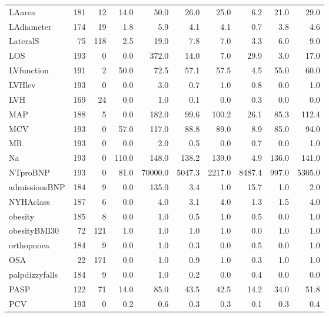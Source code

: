 \begin{footnotesize}
\begin{tabularx}{\textwidth}{P{2.4cm}RRRRRRRRR}
LAarea & 181 &  12 &  14.0 &    50.0 &   26.0 &   25.0 &    6.2 &  21.0 &   29.0 \\ 
LAdiameter & 174 &  19 &   1.8 &     5.9 &    4.1 &    4.1 &    0.7 &   3.8 &    4.6 \\ 
LateralS &  75 & 118 &   2.5 &    19.0 &    7.8 &    7.0 &    3.3 &   6.0 &    9.0 \\ 
LOS & 193 &   0 &   0.0 &   372.0 &   14.0 &    7.0 &   29.9 &   3.0 &   17.0 \\ 
LVfunction & 191 &   2 &  50.0 &    72.5 &   57.1 &   57.5 &    4.5 &  55.0 &   60.0 \\ 
LVHlev & 193 &   0 &   0.0 &     3.0 &    0.7 &    1.0 &    0.8 &   0.0 &    1.0 \\ 
LVH & 169 &  24 &   0.0 &     1.0 &    0.1 &    0.0 &    0.3 &   0.0 &    0.0 \\ 
MAP & 188 &   5 &   0.0 &   182.0 &   99.6 &  100.2 &   26.1 &  85.3 &  112.4 \\ 
MCV & 193 &   0 &  57.0 &   117.0 &   88.8 &   89.0 &    8.9 &  85.0 &   94.0 \\ 
MR & 193 &   0 &   0.0 &     2.0 &    0.5 &    0.0 &    0.7 &   0.0 &    1.0 \\ 
Na & 193 &   0 & 110.0 &   148.0 &  138.2 &  139.0 &    4.9 & 136.0 &  141.0 \\ 
NTproBNP & 193 &   0 &  81.0 & 70000.0 & 5047.3 & 2217.0 & 8487.4 & 997.0 & 5305.0 \\ 
admissionsBNP & 184 &   9 &   0.0 &   135.0 &    3.4 &    1.0 &   15.7 &   1.0 &    2.0 \\ 
NYHAclass & 187 &   6 &   0.0 &     4.0 &    3.1 &    4.0 &    1.3 &   1.5 &    4.0 \\ 
obesity & 185 &   8 &   0.0 &     1.0 &    0.5 &    1.0 &    0.5 &   0.0 &    1.0 \\ 
obesityBMI30 &  72 & 121 &   1.0 &     1.0 &    1.0 &    1.0 &    0.0 &   1.0 &    1.0 \\ 
orthopnoea & 184 &   9 &   0.0 &     1.0 &    0.3 &    0.0 &    0.5 &   0.0 &    1.0 \\ 
OSA &  22 & 171 &   0.0 &     1.0 &    0.9 &    1.0 &    0.3 &   1.0 &    1.0 \\ 
palpdizzyfalls & 184 &   9 &   0.0 &     1.0 &    0.2 &    0.0 &    0.4 &   0.0 &    0.0 \\ 
PASP & 122 &  71 &  14.0 &    85.0 &   43.5 &   42.5 &   14.2 &  34.0 &   51.8 \\ 
PCV & 193 &   0 &   0.2 &     0.6 &    0.3 &    0.3 &    0.1 &   0.3 &    0.4 \\ 

\end{tabularx}
\end{footnotesize}
